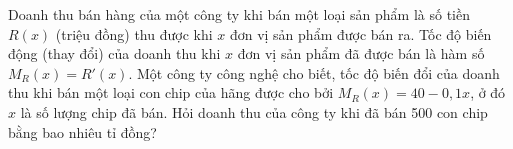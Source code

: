 \begin{ex}%
	Doanh thu bán hàng của một công ty khi bán một loại sản phẩm là số tiền $R(x)$ (triệu đồng) thu được khi $x$ đơn vị sản phẩm được bán ra. Tốc độ biến động (thay đổi) của doanh thu khi $x$ đơn vị sản phẩm đã được bán là hàm số $M_R(x)=R'(x)$. Một công ty công nghệ cho biết, tốc độ biến đổi của doanh thu khi bán một loại con chip của hãng được cho bởi $M_R(x)=40-0{,}1x$, ở đó $x$ là số lượng chip đã bán. Hỏi doanh thu của công ty khi đã bán 500 con chip bằng bao nhiêu tỉ đồng?
\end{ex}
